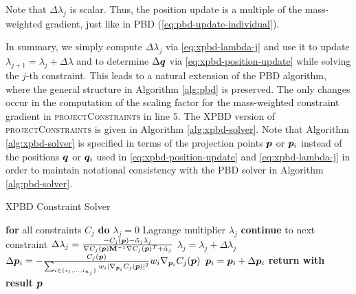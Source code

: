 \noindent Note that $\Delta \lambda_j$ is scalar. Thus, the position update is a multiple of the mass-weighted gradient, just like in PBD 
(\cref{eq:pbd-update-individual}).

In summary, we simply compute $\Delta \lambda_j$ via \autoref{eq:xpbd-lambda-j} and use it to 
update $\lambda_{j+1} = \lambda_j + \Delta \lambda$ and to determine $\Delta \bm{q}$ via \autoref{eq:xpbd-position-update} while solving the $j$-th constraint. 
This leads to a natural extension of the PBD algorithm, where the general structure in Algorithm \ref{alg:pbd} is preserved. The only changes occur in the 
computation of the scaling factor for the 
mass-weighted constraint gradient in \textsc{projectConstraints} in line 5. The XPBD version of \textsc{projectConstraints} is given in 
Algorithm \ref{alg:xpbd-solver}. Note that Algorithm \ref{alg:xpbd-solver} is specified in terms of the projection points $\bm{p}$ or $\bm{p}_i$ instead of the 
positions $\bm{q}$ or $\bm{q}_i$ used in \autoref{eq:xpbd-position-update} and \autoref{eq:xpbd-lambda-j} in order to maintain notational consistency with the
PBD solver in Algorithm \ref{alg:pbd-solver}.

\begin{algorithm}
\caption{XPBD Constraint Solver}\label{alg:xpbd-solver}
\begin{algorithmic}[1]
\State \textbf{for} all constraints $C_j$ \textbf{do} $\lambda_j = 0$
\StatexIndent[3] Lagrange multiplier $\lambda_j$ \algorithmicdo
{}
\State \textbf{continue} to next constraint
\EndIf
\State $\Delta \lambda_j = \frac{-C_j(\bm{p}) - \tilde{\alpha}_j \lambda_{j}}{\nabla C_j(\bm{p}) \mathbf{M}^{-1} \nabla C_j(\bm{p})^T + \tilde{\alpha}_j}$
\State $\lambda_{j} = \lambda_{j} + \Delta \lambda_j$
\State $\Delta \bm{p}_i = -\frac{C_j(\bm{p})}{\sum_{i \in \{ i_1, \ldots, i_{n_j} \}} w_i \vert \nabla_{\bm{p}_i}C_j(\bm{p}) \vert^2 } w_i 
\nabla_{\bm{p}_i} C_j(\bm{p})$
\State $\bm{p}_i = \bm{p}_i + \Delta \bm{p}_i$
\EndFor
\EndFor
\EndFor
\State \textbf{return with result } $\bm{p}$
\EndProcedure
\end{algorithmic}
\end{algorithm}

